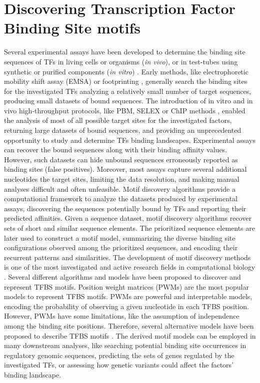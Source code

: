 \documentclass[a4paper, titlepage, 8pt, openright]{book}
\begin{document}
\section{Discovering Transcription Factor Binding Site motifs}
Several experimental assays have been developed to determine the binding site sequences of TFs in living cells or organisms (\emph{in vivo}), or in test-tubes using synthetic or purified components (\emph{in vitro}) \citep{jolma2011methods}. Early methods, like electrophoretic mobility shift assay (EMSA) \citep{garner1981gel} or footprinting \citep{hampshire2007footprinting}, generally search the binding sites for the investigated TFs analyzing a relatively small number of target sequences, producing small datasets of bound sequences. The introduction of in vitro and in vivo high-throughput protocols, like PBM, SELEX or ChIP methods \citep{berger2006compact,jolma2010multiplexed,collas2008chop}, enabled the analysis of most of all possible target sites for the investigated factors, returning large datasets of bound sequences, and providing an unprecedented opportunity to study and determine TFs binding landscapes. Experimental assays can recover the bound sequences along with their binding affinity values. However, such datasets can hide unbound sequences erroneously reported as binding sites (false positives). Moreover, most assays capture several additional nucleotides the target sites, limiting the data resolution, and making manual analyses difficult and often unfeasible. Motif discovery algorithms provide a computational framework to analyze the datasets produced by experimental assays, discovering the sequences potentially bound by TFs and reporting their predicted affinities. Given a sequence dataset, motif discovery algorithms recover sets of short and similar sequence elements. The prioritized sequence elements are later used to construct a motif model, summarizing the diverse binding site configurations observed among the prioritized sequences, and encoding their recurrent patterns and similarities. The development of motif discovery methods is one of the most investigated and active research fields in computational biology \citep{pavesi2004silico,tompa2005assessing,d2006does,das2007survey,zambelli2013motif}. Several different algorithms and models have been proposed to discover and represent TFBS motifs. Position weight matrices (PWMs) \citep{stormo2000dna} are the most popular models to represent TFBS motifs. PWMs are powerful and interpretable models, encoding the probability of observing a given nucleotide in each TFBS position. However, PWMs have some limitations, like the assumption of independence among the binding site positions. Therefore, several alternative models have been proposed to describe TFBS motifs \citep{siddharthan2010dinucleotide,gorkin2012integration,he2021survey}. The derived motif models can be employed in many downstream analyses, like searching potential binding site occurrences in regulatory genomic sequences, predicting the sets of genes regulated by the investigated TFs, or assessing how genetic variants could affect the factors’ binding landscape.
\end{document}
